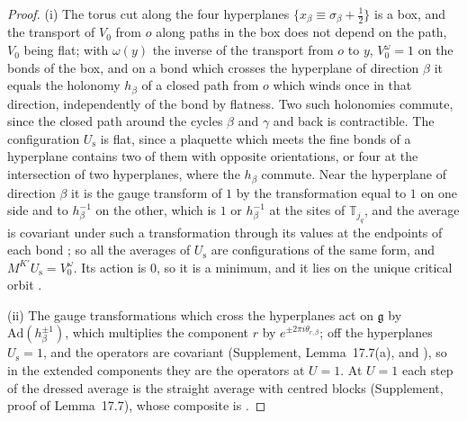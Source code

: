 \documentclass[11pt]{preprint}
\numberwithin{equation}{section}
\theoremstyle{definition}
\theoremstyle{remark}
\theoremstyle{plain}
\begin{document}
\begin{proof}
(i) The torus cut along the four hyperplanes $\{ x_\beta \equiv \sigma_\beta + \frac12 \}$ is a box, and the transport of $V_0$ from $o$ along paths in the box does not depend on the path, $V_0$ being flat; with $\omega(y)$ the inverse of the transport from $o$ to $y$, $V_0^\omega = 1$ on the bonds of the box, and on a bond which crosses the hyperplane of direction $\beta$ it equals the holonomy $h_\beta$ of a closed path from $o$ which winds once in that direction, independently of the bond by flatness. Two such holonomies commute, since the closed path around the cycles $\beta$ and $\gamma$ and back is contractible. The configuration $U_{\mathrm s}$ is flat, since a plaquette which meets the fine bonds of a hyperplane contains two of them with opposite orientations, or four at the intersection of two hyperplanes, where the $h_\beta$ commute. Near the hyperplane of direction $\beta$ it is the gauge transform of $1$ by the transformation equal to $1$ on one side and to $h_\beta^{-1}$ on the other, which is $1$ or $h_\beta^{-1}$ at the sites of $\mathbb T_{j_q}$, and the average \cite[(0.4), p.~253]{BalabanRG1} is covariant under such a transformation through its values at the endpoints of each bond \cite[(0.6), p.~253]{BalabanRG1}; so all the averages of $U_{\mathrm s}$ are configurations of the same form, and $M^{K'}U_{\mathrm s} = V_0^\omega$. Its action is $0$, so it is a minimum, and it lies on the unique critical orbit \cite[Theorem~1, p.~279]{BalabanVAR}.

(ii) The gauge transformations which cross the hyperplanes act on $\mathfrak g$ by $\mathrm{Ad}(h_\beta^{\pm1})$, which multiplies the component $r$ by $e^{\pm2\pi i\theta_{r,\beta}}$; off the hyperplanes $U_{\mathrm s} = 1$, and the operators are covariant (Supplement, Lemma~17.7(a), and \cite[(3.32), p.~395]{BalabanPBG}), so in the extended components they are the operators at $U = 1$. At $U = 1$ each step of the dressed average is the straight average with centred blocks (Supplement, proof of Lemma~17.7), whose composite is \cite[(1.18), p.~20]{BalabanPRT1}.


\end{proof}
\end{document}
